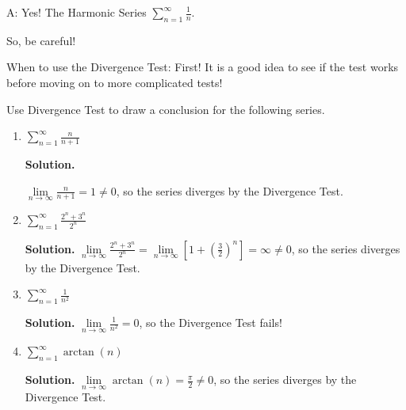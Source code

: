 A\@: Yes! The Harmonic Series $ \displaystyle \sum\limits_{n=1}^{\infty}\frac{1}{n} $.

So, be careful!

When to use the Divergence Test: First! It is a good idea to see if the test works before
moving on to more complicated tests!

\begin{Example}{}{}
    Use Divergence Test to draw a conclusion
    for the following series.
    \begin{enumerate}[label=(\roman*)]
        \item $ \displaystyle\sum\limits_{n=1}^{\infty} \frac{n}{n+1} $

              \textbf{Solution.}

              $ \displaystyle \lim\limits_{{n} \to {\infty}} \frac{n}{n+1} =1\neq 0 $, so the series diverges
              by the Divergence Test.
        \item $ \displaystyle\sum\limits_{n=1}^{\infty} \frac{2^{n}+3^n}{2^n} $

              \textbf{Solution.}
              $ \displaystyle  \lim\limits_{{n} \to {\infty}} \frac{2^n+3^n}{2^n} =\lim\limits_{{n} \to {\infty}}
                  \left[ 1+\left( \frac{3}{2} \right)^n  \right]=\infty\neq 0 $,
              so the series diverges by the Divergence Test.
        \item $ \displaystyle\sum\limits_{n=1}^{\infty} \frac{1}{n^2} $

              \textbf{Solution.}
              $ \displaystyle \lim\limits_{{n} \to {\infty}}
                  \frac{1}{n^2} =0 $, so the Divergence Test fails!
        \item $ \displaystyle\sum\limits_{n=1}^{\infty} \arctan(n) $

              \textbf{Solution.} $ \displaystyle \lim\limits_{{n} \to {\infty}}
                  \arctan(n)=\frac{\pi}{2}\neq 0 $, so the series diverges
              by the Divergence Test.
    \end{enumerate}
\end{Example}
